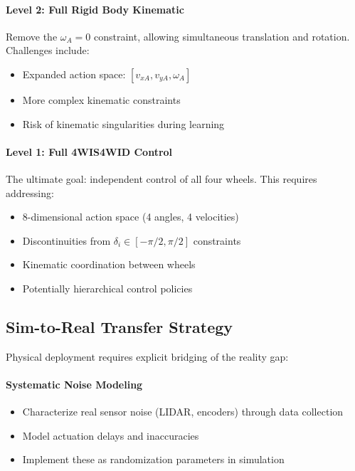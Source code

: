 \documentclass[11pt,a4paper,twocolumn]{article}
\begin{document}
\paragraph{Level 2: Full Rigid Body Kinematic}
Remove the $\omega_A = 0$ constraint, allowing simultaneous translation and rotation. Challenges include:
\begin{itemize}
    \item Expanded action space: $[v_{xA}, v_{yA}, \omega_A]$
    \item More complex kinematic constraints
    \item Risk of kinematic singularities during learning
\end{itemize}

\paragraph{Level 1: Full 4WIS4WID Control}
The ultimate goal: independent control of all four wheels. This requires addressing:
\begin{itemize}
    \item 8-dimensional action space (4 angles, 4 velocities)
    \item Discontinuities from $\delta_i \in [-\pi/2, \pi/2]$ constraints
    \item Kinematic coordination between wheels
    \item Potentially hierarchical control policies
\end{itemize}

\subsection{Sim-to-Real Transfer Strategy}

Physical deployment requires explicit bridging of the reality gap:

\paragraph{Systematic Noise Modeling}
\begin{itemize}
    \item Characterize real sensor noise (LIDAR, encoders) through data collection
    \item Model actuation delays and inaccuracies
    \item Implement these as randomization parameters in simulation
\end{itemize}
\end{document}
